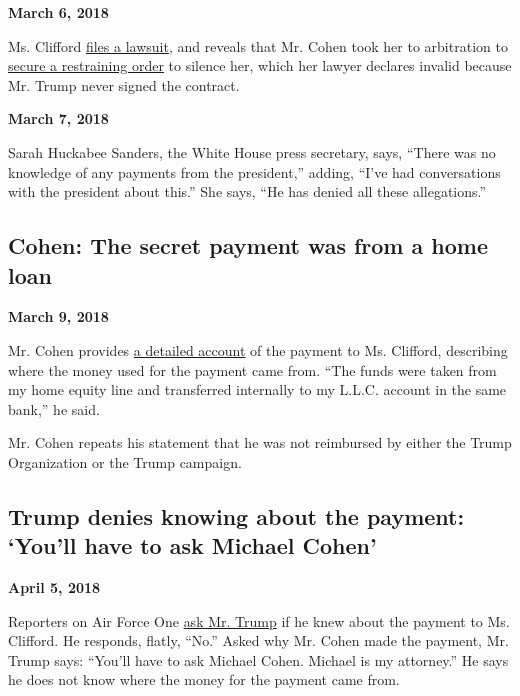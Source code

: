 \textbf{March 6, 2018}

Ms. Clifford
\href{https://www.nytimes3xbfgragh.onion/2018/03/06/us/stormy-daniels-trump-lawsuit.html}{files
a lawsuit}, and reveals that Mr. Cohen took her to arbitration to
\href{https://www.nytimes3xbfgragh.onion/2018/03/07/us/politics/stormy-daniels-trump.html}{secure
a restraining order} to silence her, which her lawyer declares invalid
because Mr. Trump never signed the contract.

\textbf{March 7, 2018}

Sarah Huckabee Sanders, the White House press secretary, says, ``There
was no knowledge of any payments from the president,'' adding, ``I've
had conversations with the president about this.'' She says, ``He has
denied all these allegations.''

\hypertarget{cohen-the-secret-payment-was-from-a-home-loan}{%
\subsection{Cohen: The secret payment was from a home
loan}\label{cohen-the-secret-payment-was-from-a-home-loan}}

\textbf{March 9, 2018}

Mr. Cohen provides
\href{https://abcnews.go.com/Politics/michael-cohen-dismisses-claims-email-proof-trump-knew/story?id=53642094}{a
detailed account} of the payment to Ms. Clifford, describing where the
money used for the payment came from. ``The funds were taken from my
home equity line and transferred internally to my L.L.C. account in the
same bank,'' he said.

Mr. Cohen repeats his statement that he was not reimbursed by either the
Trump Organization or the Trump campaign.

\hypertarget{trump-denies-knowing-about-the-payment-youll-have-to-ask-michael-cohen}{%
\subsection{Trump denies knowing about the payment: `You'll have to ask
Michael
Cohen'}\label{trump-denies-knowing-about-the-payment-youll-have-to-ask-michael-cohen}}

\textbf{April 5, 2018}

Reporters on Air Force One
\href{https://www.nytimes3xbfgragh.onion/2018/04/05/us/politics/trump-stormy-daniels-hush-money.html}{ask
Mr. Trump} if he knew about the payment to Ms. Clifford. He responds,
flatly, ``No.'' Asked why Mr. Cohen made the payment, Mr. Trump says:
``You'll have to ask Michael Cohen. Michael is my attorney.'' He says he
does not know where the money for the payment came from.

